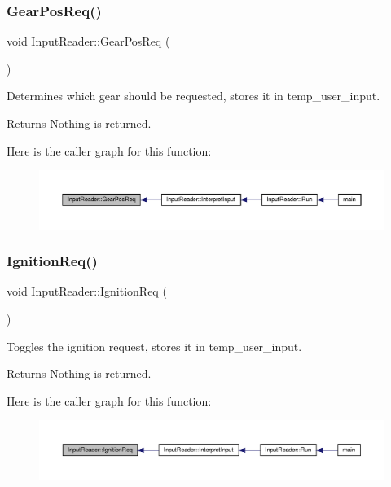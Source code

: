 \subsubsection{\texorpdfstring{Gear\+Pos\+Req()}{GearPosReq()}}
{\footnotesize\ttfamily void Input\+Reader\+::\+Gear\+Pos\+Req (\begin{DoxyParamCaption}{ }\end{DoxyParamCaption})}

Determines which gear should be requested, stores it in temp\+\_\+user\+\_\+input. \begin{DoxyReturn}{Returns}
Nothing is returned. 
\end{DoxyReturn}
Here is the caller graph for this function\+:
\nopagebreak
\begin{figure}[H]
\begin{center}
\leavevmode
\includegraphics[width=350pt]{classInputReader_aec41f6307eb1f4ca8308d4f002ce1cf0_icgraph}
\end{center}
\end{figure}
\mbox{\label{classInputReader_a0a4c53621f5b7c8e3373341c1f383001}} 
\subsubsection{\texorpdfstring{Ignition\+Req()}{IgnitionReq()}}
{\footnotesize\ttfamily void Input\+Reader\+::\+Ignition\+Req (\begin{DoxyParamCaption}{ }\end{DoxyParamCaption})}

Toggles the ignition request, stores it in temp\+\_\+user\+\_\+input. \begin{DoxyReturn}{Returns}
Nothing is returned. 
\end{DoxyReturn}
Here is the caller graph for this function\+:
\nopagebreak
\begin{figure}[H]
\begin{center}
\leavevmode
\includegraphics[width=350pt]{classInputReader_a0a4c53621f5b7c8e3373341c1f383001_icgraph}
\end{center}
\end{figure}
\mbox{\label{classInputReader_a83a83d74ccb7cd6a29da3b558babaf1c}} 
